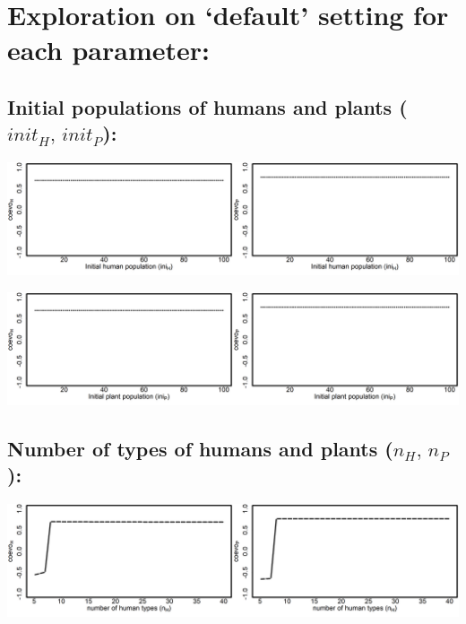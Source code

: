 \documentclass[]{book}
\begin{document}
\newpage

\hypertarget{exploration-on-default-setting-for-each-parameter}{%
\section{Exploration on `default' setting for each parameter:}\label{exploration-on-default-setting-for-each-parameter}}

\hypertarget{initial-populations-of-humans-and-plants-init_hinit_p}{%
\subsection{\texorpdfstring{Initial populations of humans and plants (\(init_{H},\,init_{P}\)):}{Initial populations of humans and plants (init\_\{H\},\textbackslash{},init\_\{P\}):}}\label{initial-populations-of-humans-and-plants-init_hinit_p}}

\includegraphics[width=1\linewidth]{plots/2_onePar-init.H_bifplot-pair}

\includegraphics[width=1\linewidth]{plots/2_onePar-init.P_bifplot-pair}

\hypertarget{number-of-types-of-humans-and-plants-n_hn_p}{%
\subsection{\texorpdfstring{Number of types of humans and plants (\(n_{H},\,n_{P}\)):}{Number of types of humans and plants (n\_\{H\},\textbackslash{},n\_\{P\}):}}\label{number-of-types-of-humans-and-plants-n_hn_p}}

\includegraphics[width=1\linewidth]{plots/2_onePar-n.H_bifplot-pair}
\end{document}
